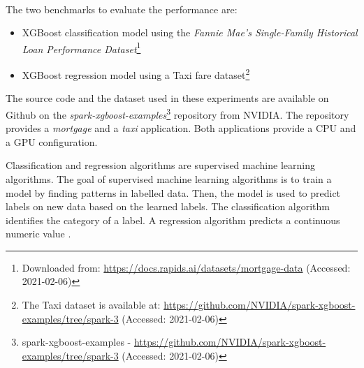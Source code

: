 \paragraph{}
The two benchmarks to evaluate the performance are:
\begin{itemize}
\item XGBoost classification model using the \textit{Fannie Mae’s Single-Family Historical Loan Performance Dataset}\footnote{Downloaded from: \url{https://docs.rapids.ai/datasets/mortgage-data} (Accessed: 2021-02-06)}\cite{Fannie2021Mortgage}

\item XGBoost regression model using a Taxi fare dataset\footnote{The Taxi dataset is available at: \url{https://github.com/NVIDIA/spark-xgboost-examples/tree/spark-3} (Accessed: 2021-02-06)}
\end{itemize}
The source code and the dataset used in these experiments are available on Github on the \textit{spark-xgboost-examples}\footnote{spark-xgboost-examples - \url{https://github.com/NVIDIA/spark-xgboost-examples/tree/spark-3} (Accessed: 2021-02-06)} repository from NVIDIA.
The repository provides a \textit{mortgage} and a \textit{taxi} application. Both applications provide a CPU and a GPU configuration.

Classification and regression algorithms are supervised machine learning algorithms.
The goal of supervised machine learning algorithms is to train a model by finding patterns in labelled data. Then, the model is used to predict labels on new data based on the learned labels.
The classification algorithm identifies the category of a label.
A regression algorithm predicts a continuous numeric value \cite{Mcdonald2020SparkRapids}.


